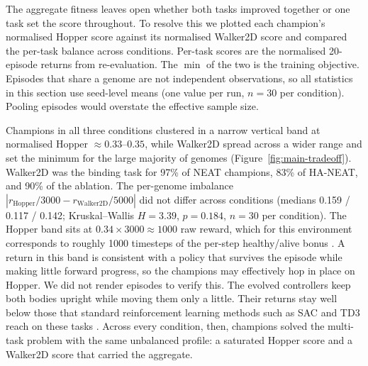 \documentclass[12pt]{article}
\begin{document}
The aggregate fitness leaves open whether both tasks improved together or one task set the score throughout. To resolve this we plotted each champion's normalised Hopper score against its normalised Walker2D score and compared the per-task balance across conditions.
Per-task scores are the normalised 20-episode returns from re-evaluation. The $\min$ of the two is the training objective.
Episodes that share a genome are not independent observations, so all statistics in this section use seed-level means (one value per run, $n = 30$ per condition). Pooling episodes would overstate the effective sample size.

Champions in all three conditions clustered in a narrow vertical band at normalised Hopper $\approx 0.33$--$0.35$, while Walker2D spread across a wider range and set the minimum for the large majority of genomes (Figure~\ref{fig:main-tradeoff}).
Walker2D was the binding task for 97\% of NEAT champions, 83\% of HA-NEAT, and 90\% of the ablation.
The per-genome imbalance $|r_{\text{Hopper}}/3000 - r_{\text{Walker2D}}/5000|$ did not differ across conditions (medians 0.159 / 0.117 / 0.142; Kruskal--Wallis $H = 3.39$, $p = 0.184$, $n = 30$ per condition).
The Hopper band sits at $0.34 \times 3000 \approx 1000$ raw reward, which for this environment corresponds to roughly 1000 timesteps of the per-step healthy/alive bonus \parencite{freeman_brax_2021}.
A return in this band is consistent with a policy that survives the episode while making little forward progress, so the champions may effectively hop in place on Hopper. We did not render episodes to verify this.
The evolved controllers keep both bodies upright while moving them only a little. Their returns stay well below those that standard reinforcement learning methods such as SAC and TD3 reach on these tasks \parencite{haarnoja_soft_2018,fujimoto_addressing_2018}.
Across every condition, then, champions solved the multi-task problem with the same unbalanced profile: a saturated Hopper score and a Walker2D score that carried the aggregate.
\end{document}
